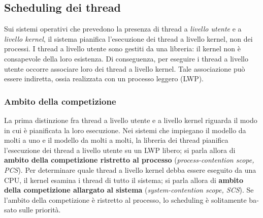 \documentclass[11pt,a4paper]{article}
\begin{document}
\subsection{Scheduling dei thread}
Sui sistemi operativi che prevedono la presenza di thread a \emph{livello utente} e a \emph{livello kernel},
il sistema pianifica l'esecuzione dei thread a livello kernel, non dei processi. I thread a livello utente sono gestiti da una libreria: il kernel non è consapevole della loro esistenza. Di
conseguenza, per eseguire i thread a livello utente occorre associare loro dei thread a livello
kernel. Tale associazione può essere indiretta, ossia realizzata con un processo leggero (LWP).

\subsubsection{Ambito della competizione}
La prima distinzione fra thread a livello utente e a livello kernel riguarda il modo in cui è
pianificata la loro esecuzione. Nei sistemi che impiegano il modello da molti a uno e il modello da molti a molti, la libreria dei thread pianifica
l'esecuzione dei thread a livello utente su un LWP libero; si parla allora di \textbf{ambito della com­petizione ristretto al processo} (\emph{process-contention scope, PCS}). 
Per determinare quale
thread a livello kernel debba essere eseguito da una CPU, il kernel esamina i thread di tutto
il sistema; si parla allora di \textbf{ambito della competizione allargato al sistema} (\emph{system-contention scope, SCS}).
Se l'ambito della competizione è ristretto al processo, lo scheduling è solitamente ba­sato sulle priorità.
\end{document}
